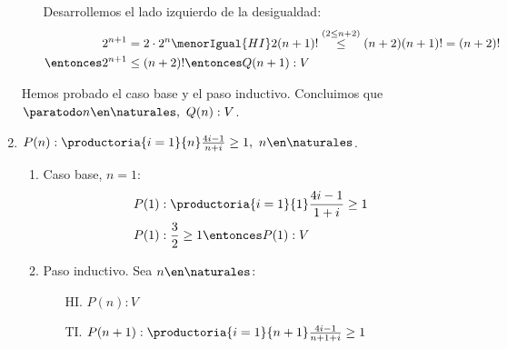 \begin{enumerate}[label=\roman*)]
\begin{enumerate}[label=\arabic*)]
                Desarrollemos el lado izquierdo de la desigualdad:
                \begin{align*}
                  2^{n+1}           & = 2 \cdot 2^n \menorIgual{HI} 2 (n+1)! \overset{(2\leq n+2)}{\leq} (n+2)(n+1)! = (n+2)! \\
                  \entonces 2^{n+1} & \leq (n+2)! \entonces Q(n+1):V
                \end{align*}
        \end{enumerate}

        Hemos probado el caso base y el paso inductivo. Concluimos que $\paratodo n \en \naturales, \ Q(n): V$.

  \item $P(n):  \productoria{i=1}{n}\frac{4i-1}{n+i} \geq 1, \ n \en \naturales$.
        \begin{enumerate}[label=\arabic*)]
          \item Caso base, $n = 1$:
                \begin{align*}
                  P(1) & : \productoria{i=1}{1} \frac{4i-1}{1+i} \geq 1 \\
                  P(1) & : \frac{3}{2} \geq 1 \entonces P(1): V
                \end{align*}
          \item Paso inductivo. Sea $n \en \naturales$:
                \begin{enumerate}
                  \item[HI.] $P(n): V$
                  \item[TI.] $P(n+1):  \productoria{i=1}{n+1} \frac{4i-1}{n+1+i} \geq 1 $
                \end{enumerate}


\end{enumerate}
\end{enumerate}
